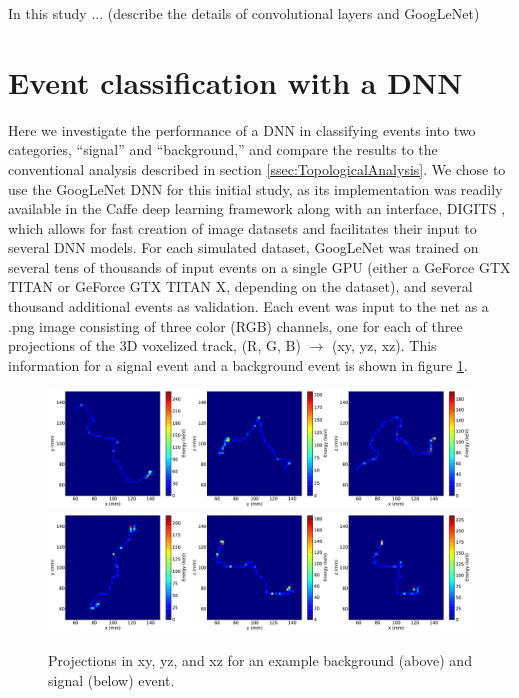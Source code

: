 \documentclass{JINST}
\begin{document}
In this study ... (describe the details of convolutional layers and GoogLeNet)

\section{Event classification with a DNN}
Here we investigate the performance of a DNN in classifying events into two categories, ``signal'' and ``background,'' and compare the results to the conventional analysis described in
section \ref{ssec:TopologicalAnalysis}.  We chose to use the GoogLeNet \cite{Googlenet} DNN for this initial study, as its implementation was readily available in the Caffe \cite{jia2014caffe}
deep learning framework along with an interface, DIGITS \cite{DIGITS}, which allows for fast creation of image datasets and facilitates their input to several DNN models.  For each simulated
dataset, GoogLeNet was trained on several tens of thousands of input events on a single GPU (either a GeForce GTX TITAN or GeForce GTX TITAN X, depending on the dataset), and several
thousand additional events as validation.  Each event was input to the net as a .png image consisting of three
color (RGB) channels, one for each of three projections of the 3D voxelized track, (R, G, B) $\rightarrow$ (xy, yz, xz).  This information for a signal event and a background event is
shown in figure \ref{fig.exampleProjs}.

\begin{figure}[!htb]
	\centering
	\includegraphics[scale=0.36]{fig/plt_h2D_vox_dnn3d_NEXT100_Paolina222_v2x2x2_r200x200x200_0_bg.pdf}
	\includegraphics[scale=0.36]{fig/plt_h2D_vox_dnn3d_NEXT100_Paolina222_v2x2x2_r200x200x200_2_si.pdf}
	\caption{\label{fig.exampleProjs}Projections in xy, yz, and xz for an example background (above) and signal (below) event.}
\end{figure}
\end{document}
